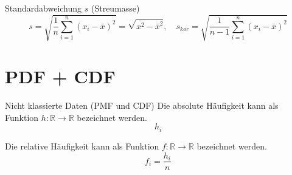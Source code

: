 \begin{definition}{Standardabweichung $s$ (Streumasse)}
$$
s=\sqrt{\frac{1}{n} \sum_{i=1}^{n}\left(x_{i}-\bar{x}\right)^{2}}=\sqrt{\overline{x^{2}}-\bar{x}^{2}}, \quad s_{k o r}=\sqrt{\frac{1}{n-1} \sum_{i=1}^{n}\left(x_{i}-\bar{x}\right)^{2}}
$$
\end{definition}

\section{PDF + CDF}
\begin{definition}{Nicht klassierte Daten (PMF und CDF)}
Die absolute Häufigkeit kann als Funktion $h: \mathbb{R} \rightarrow \mathbb{R}$ bezeichnet werden.
$$
h_{i}
$$

Die relative Häufigkeit kann als Funktion $f: \mathbb{R} \rightarrow \mathbb{R}$ bezeichnet werden.
$$
f_{i}=\frac{h_{i}}{n}
$$
\end{definition}
